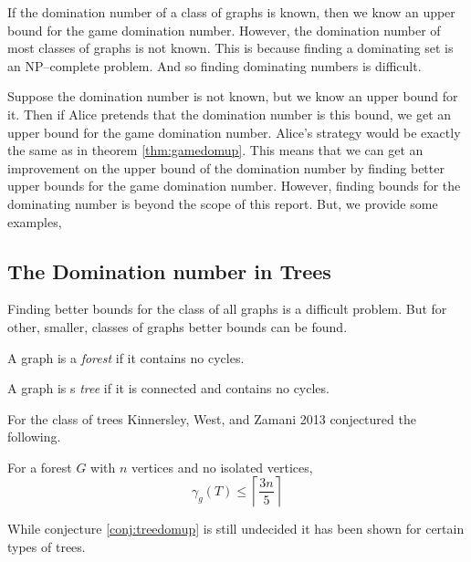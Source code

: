 If the domination number of a class of graphs is known, then we know an upper bound for the game domination number. However, the domination number of most classes of graphs is not known. This is because finding a dominating set is an NP--complete problem. And so finding dominating numbers is difficult.

Suppose the domination number is not known, but we know an upper bound for it. Then if Alice pretends that the domination number is this bound, we get an upper bound for the game domination number. Alice's strategy would be exactly the same as in theorem \ref{thm:gamedomup}. This means that we can get an improvement on the upper bound of the domination number by finding  better upper bounds for the game domination number. However, finding bounds for the dominating number is beyond the scope of this report. But, we provide some examples,


\subsection{The Domination number in Trees}
Finding better bounds for the class of all graphs is a difficult problem. But for other, smaller, classes of graphs better bounds can be found. 
\begin{definition}[Forest]
    A graph is a \textit{forest} if it contains no cycles. 
\end{definition}
\begin{definition}[Tree]
    A graph is s \textit{tree} if it is connected and contains no cycles.
\end{definition}
For the class of trees
Kinnersley, West, and Zamani 2013 \cite{KiWeZa2013} conjectured the following. 
\begin{conjecture} \label{conj:treedomup}
    For a forest $G$ with $n$ vertices and no isolated vertices,    
    \[ \gamma_g(T) \leq \left\lceil \frac{3n}{5} \right\rceil\]
\end{conjecture}
While conjecture \ref{conj:treedomup} is still undecided it has been shown for certain types of trees. 

